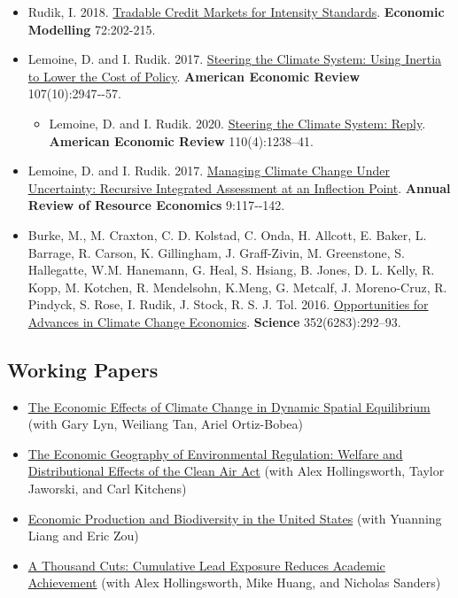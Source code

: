\documentclass[12pt]{res} %
\begin{document}
\begin{resume}
\begin{itemize}
	\item[] Rudik, I. 2018. \href{https://www.sciencedirect.com/science/article/pii/S0264999317315651}{Tradable Credit Markets for Intensity Standards}. \textbf{Economic Modelling} 72:202-215.
	\item[] Lemoine, D. and I. Rudik. 2017.  \href{http://papers.ssrn.com/sol3/papers.cfm?abstract_id=2443594}{Steering the Climate System: Using Inertia to Lower the Cost of Policy}. \textbf{American Economic Review} 107(10):2947‐-57.
	\begin{itemize}
		\item[] Lemoine, D. and I. Rudik. 2020.  \href{http://papers.ssrn.com/sol3/papers.cfm?abstract_id=2443594}{Steering the Climate System: Reply}. \textbf{American Economic Review} 110(4):1238--41.
	\end{itemize}
	\item[] Lemoine, D. and I. Rudik. 2017. \href{https://papers.ssrn.com/sol3/papers.cfm?abstract_id=2862211}{Managing Climate Change Under Uncertainty: Recursive Integrated Assessment at an Inflection Point}.  \textbf{Annual Review of Resource Economics} 9:117‐-142.
	\item[]  Burke, M., M. Craxton, C. D. Kolstad, C. Onda, H. Allcott, E. Baker, L. Barrage, R. Carson, K. Gillingham, J. Graff-Zivin, M. Greenstone, S. Hallegatte, W.M. Hanemann, G. Heal, S. Hsiang, B. Jones, D. L. Kelly, R. Kopp, M. Kotchen, R. Mendelsohn, K.Meng, G. Metcalf, J. Moreno-Cruz, R. Pindyck, S. Rose, I. Rudik, J. Stock, R. S. J. Tol. 2016. \href{http://science.sciencemag.org/content/352/6283/292.abstract}{Opportunities for Advances in Climate Change Economics}. \textbf{Science} 352(6283):292--93.
\end{itemize} 


\vspace{-.2in}


\subsection{Working Papers}

\begin{itemize} %
	\item[] \href{https://osf.io/preprints/socarxiv/usghb}{The Economic Effects of Climate Change in Dynamic Spatial Equilibrium} (with Gary Lyn, Weiliang Tan, Ariel Ortiz-Bobea)
	\item[]\href{https://ivanrudik.com}{The Economic Geography of Environmental Regulation: Welfare and Distributional Effects of the Clean Air Act} (with Alex Hollingsworth, Taylor Jaworski, and Carl Kitchens)
	\item[] \href{https://osf.io/preprints/socarxiv/qy76a}{Economic Production and Biodiversity in the United States} (with Yuanning Liang and Eric Zou)
	\item[] \href{https://www.nber.org/papers/w28250}{A Thousand Cuts: Cumulative Lead Exposure Reduces Academic Achievement} (with Alex Hollingsworth, Mike Huang, and Nicholas Sanders)
\end{itemize}


\end{resume}
\end{document}
